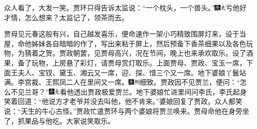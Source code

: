 众人看了，大发一笑。贾环只得告诉太监说：“一个枕头，一个兽头。”{\includegraphics[width=3mm]{../Images/00004}\includegraphics[width=3mm]{../Images/00012}\footnotesize \kaishu 亏他好才情，怎么想来？}太监记了，领茶而去。

贾母见元春这般有兴，自己越发喜乐，便命速作一架小巧精致围屏灯来，设于当屋，命他姊妹各自暗暗的作了，写出来粘于屏上，然后预备下香茶细果以及各色玩物，为猜着之贺。贾政朝罢，见贾母高兴，况在节间，晚上也来承欢取乐。设了酒果，备了玩物，上房悬了彩灯，请贾母赏灯取乐。上面贾母、贾政、宝玉一席，下面王夫人、宝钗、黛玉、湘云又一席，迎、探、惜三个又一席。地下婆娘丫鬟站满。李宫裁、王熙凤二人在里间又一席。{\includegraphics[width=3mm]{../Images/00004}\includegraphics[width=3mm]{../Images/00011}\footnotesize \kaishu 细致。}贾政因不见贾兰，便问：“怎么不见兰哥？”{\includegraphics[width=3mm]{../Images/00004}\includegraphics[width=3mm]{../Images/00012}\footnotesize \kaishu 看他透出贾政极爱贾兰。}地下婆娘忙进里间问李氏，李氏起身笑着回道：“他说方才老爷并没去叫他，他不肯来。”婆娘回复了贾政。众人都笑说：“天生的牛心古怪。”贾政忙遣贾环与两个婆娘将贾兰唤来。贾母命他在身旁坐了，抓果品与他吃。大家说笑取乐。

